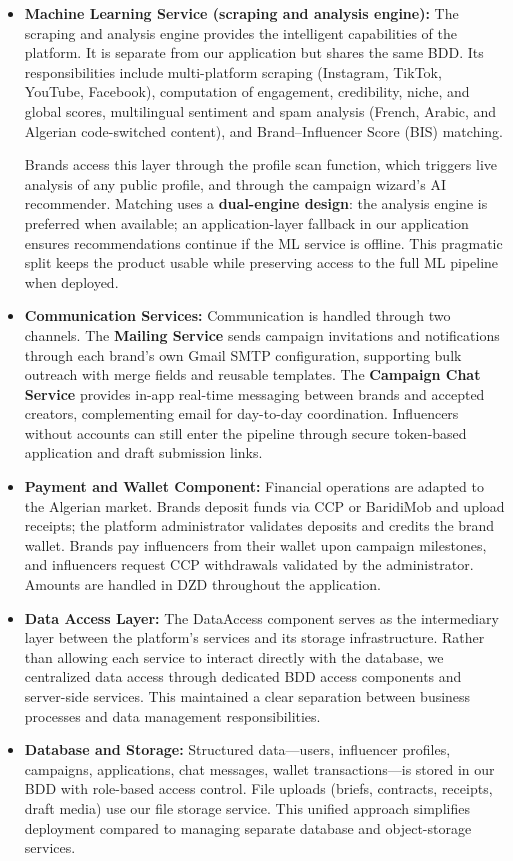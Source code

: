 \begin{itemize}
    \item \textbf{Machine Learning Service (scraping and analysis engine):} The scraping and analysis engine provides the intelligent capabilities of the platform. It is separate from our application but shares the same BDD. Its responsibilities include multi-platform scraping (Instagram, TikTok, YouTube, Facebook), computation of engagement, credibility, niche, and global scores, multilingual sentiment and spam analysis (French, Arabic, and Algerian code-switched content), and Brand--Influencer Score (BIS) matching.

Brands access this layer through the profile scan function, which triggers live analysis of any public profile, and through the campaign wizard's AI recommender. Matching uses a \textbf{dual-engine design}: the analysis engine is preferred when available; an application-layer fallback in our application ensures recommendations continue if the ML service is offline. This pragmatic split keeps the product usable while preserving access to the full ML pipeline when deployed.

    \item \textbf{Communication Services:} Communication is handled through two channels. The \textbf{Mailing Service} sends campaign invitations and notifications through each brand's own Gmail SMTP configuration, supporting bulk outreach with merge fields and reusable templates. The \textbf{Campaign Chat Service} provides in-app real-time messaging between brands and accepted creators, complementing email for day-to-day coordination. Influencers without accounts can still enter the pipeline through secure token-based application and draft submission links.
    \item \textbf{Payment and Wallet Component:} Financial operations are adapted to the Algerian market. Brands deposit funds via CCP or BaridiMob and upload receipts; the platform administrator validates deposits and credits the brand wallet. Brands pay influencers from their wallet upon campaign milestones, and influencers request CCP withdrawals validated by the administrator. Amounts are handled in DZD throughout the application.

    \item \textbf{Data Access Layer:} The DataAccess component serves as the intermediary layer between the platform's services and its storage infrastructure. Rather than allowing each service to interact directly with the database, we centralized data access through dedicated BDD access components and server-side services. This maintained a clear separation between business processes and data management responsibilities.
    \item \textbf{Database and Storage:} Structured data---users, influencer profiles, campaigns, applications, chat messages, wallet transactions---is stored in our BDD with role-based access control. File uploads (briefs, contracts, receipts, draft media) use our file storage service. This unified approach simplifies deployment compared to managing separate database and object-storage services.


\end{itemize}
